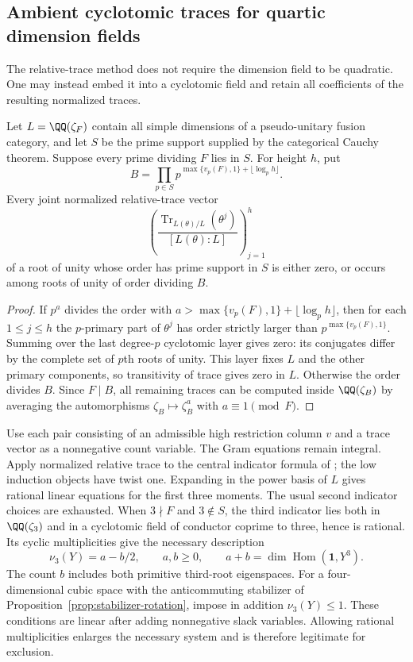\subsection{Ambient cyclotomic traces for quartic dimension fields}
\label{sec:cyclotomic-stabilizer}
The relative-trace method does not require the dimension field to be
quadratic. One may instead embed it into a cyclotomic field and retain
all coefficients of the resulting normalized traces.

\begin{proposition}
\label{prop:ambient-trace-domain}
Let $L=\QQ(\zeta_F)$ contain all simple dimensions of a pseudo-unitary
fusion category, and let $S$ be the prime support supplied by the
categorical Cauchy theorem. Suppose every prime dividing $F$ lies in
$S$. For height $h$, put
\[
 B=\prod_{p\in S}p^{\max\{v_p(F),1\}+\lfloor\log_p h\rfloor}.
\]
Every joint normalized relative-trace vector
\[
 \left(\frac{\operatorname{Tr}_{L(\theta)/L}(\theta^j)}
 {[L(\theta):L]}\right)_{j=1}^{h}
\]
of a root of unity whose order has prime support in $S$ is either zero,
or occurs among roots of unity of order dividing $B$.
\end{proposition}
\begin{proof}
If $p^a$ divides the order with
$a>\max\{v_p(F),1\}+\lfloor\log_p h\rfloor$, then for each
$1\le j\le h$ the $p$-primary part of $\theta^j$ has order strictly
larger than $p^{\max\{v_p(F),1\}}$. Summing over the last degree-$p$
cyclotomic layer gives zero: its conjugates differ by the complete set
of $p$th roots of unity. This layer fixes $L$ and the other primary
components, so transitivity of trace gives zero in $L$. Otherwise the
order divides $B$. Since $F\mid B$, all remaining traces can be computed
inside $\QQ(\zeta_B)$ by averaging the automorphisms
$\zeta_B\mapsto\zeta_B^a$ with $a\equiv1\pmod F$.
\end{proof}

Use each pair consisting of an admissible high restriction column $v$
and a trace vector as a nonnegative count variable. The Gram equations
remain integral. Apply normalized relative trace to the central
indicator formula of \cite[Theorem~4.1]{NS}; the low induction objects
have twist one. Expanding in the power basis of $L$ gives rational
linear equations for the first three moments. The usual second
indicator choices are exhausted. When $3\nmid F$ and $3\notin S$, the
third indicator lies both in $\QQ(\zeta_3)$ and in a cyclotomic field
of conductor coprime to three, hence is rational. Its cyclic
multiplicities give the necessary description
\[
 \nu_3(Y)=a-b/2,\qquad a,b\ge0,\qquad
 a+b=\dim\operatorname{Hom}(\mathbf1,Y^3).
\]
The count $b$ includes both primitive third-root eigenspaces.
For a four-dimensional cubic space with the anticommuting stabilizer
of Proposition~\ref{prop:stabilizer-rotation}, impose in addition
$\nu_3(Y)\le1$. These conditions are linear after adding nonnegative
slack variables. Allowing rational multiplicities enlarges the
necessary system and is therefore legitimate for exclusion.

